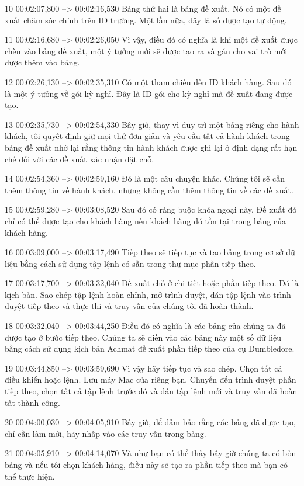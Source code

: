 10
00:02:07,800 --> 00:02:16,530
Bảng thứ hai là bảng đề xuất.  Nó có một đề xuất chăm sóc chính trên ID trường.  Một lần nữa, đây là số được tạo tự động.

11
00:02:16,680 --> 00:02:26,050
Vì vậy, điều đó có nghĩa là khi một đề xuất được chèn vào bảng đề xuất, một ý tưởng mới sẽ được tạo ra và gán cho vai trò mới được thêm vào bảng.

12
00:02:26,130 --> 00:02:35,310
Có một tham chiếu đến ID khách hàng.  Sau đó là một ý tưởng về gói kỳ nghỉ.  Đây là ID gói cho kỳ nghỉ mà đề xuất đang được tạo.

13
00:02:35,730 --> 00:02:54,330
Bây giờ, thay vì duy trì một bảng riêng cho hành khách, tôi quyết định giữ mọi thứ đơn giản và yêu cầu tất cả hành khách trong bảng đề xuất nhớ lại rằng thông tin hành khách được ghi lại ở định dạng rất hạn chế đối với các đề xuất xác nhận đặt chỗ.

14
00:02:54,360 --> 00:02:59,160
Đó là một câu chuyện khác.  Chúng tôi sẽ cần thêm thông tin về hành khách, nhưng không cần thêm thông tin về các đề xuất.

15
00:02:59,280 --> 00:03:08,520
Sau đó có ràng buộc khóa ngoại này.  Đề xuất đó chỉ có thể được tạo cho khách hàng nếu khách hàng đó tồn tại trong bảng của khách hàng.

16
00:03:09,000 --> 00:03:17,490
Tiếp theo sẽ tiếp tục và tạo bảng trong cơ sở dữ liệu bằng cách sử dụng tập lệnh có sẵn trong thư mục phần tiếp theo.

17
00:03:17,700 --> 00:03:32,040
Đề xuất chỗ ở chi tiết hoặc phần tiếp theo.  Đó là kịch bản.  Sao chép tập lệnh hoàn chỉnh, mở trình duyệt, dán tập lệnh vào trình duyệt tiếp theo và thực thi và truy vấn của chúng tôi đã hoàn thành.

18
00:03:32,040 --> 00:03:44,250
Điều đó có nghĩa là các bảng của chúng ta đã được tạo ở bước tiếp theo.  Chúng ta sẽ điền vào các bảng này một số dữ liệu bằng cách sử dụng kịch bản Achmat đề xuất phần tiếp theo của cụ Dumbledore.

19
00:03:44,850 --> 00:03:59,690
Vì vậy hãy tiếp tục và sao chép.  Chọn tất cả điều khiển hoặc lệnh.  Lưu máy Mac của riêng bạn.  Chuyển đến trình duyệt phần tiếp theo, chọn tất cả tập lệnh trước đó và dán tập lệnh mới và truy vấn đã hoàn tất thành công.

20
00:04:00,030 --> 00:04:05,910
Bây giờ, để đảm bảo rằng các bảng đã được tạo, chỉ cần làm mới, hãy nhấp vào các truy vấn trong bảng.

21
00:04:05,910 --> 00:04:14,070
Và như bạn có thể thấy bây giờ chúng ta có bốn bảng và nếu tôi chọn khách hàng, điều này sẽ tạo ra phần tiếp theo mà bạn có thể thực hiện.

